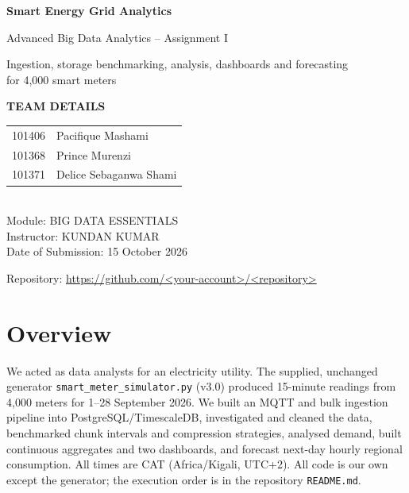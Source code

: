 \documentclass[11pt,a4paper]{article}
\newcommand{\submissiondate}{15 October 2026}
\newcommand{\repourl}{\url{https://github.com/<your-account>/<repository>}}
\begin{document}
\begin{titlepage}
\centering
\vspace*{2.5cm}
{\Huge\bfseries Smart Energy Grid Analytics\par}
\vspace{0.4cm}
{\Large Advanced Big Data Analytics -- Assignment I\par}
\vspace{0.3cm}
{\large Ingestion, storage benchmarking, analysis, dashboards and forecasting\\
for 4,000 smart meters\par}
\vspace{2.2cm}

\begin{tcolorbox}[colback=teambg, colframe=teamframe, boxrule=0.6pt, arc=0pt,
                  width=0.9\linewidth, halign=center, top=10pt, bottom=10pt]
{\large\bfseries\color{teamtitle} TEAM DETAILS}\\[8pt]
\begin{tabular}{ll}
101406 & Pacifique Mashami\\
101368 & Prince Murenzi\\
101371 & Delice Sebaganwa Shami\\
\end{tabular}\\[10pt]
Module: BIG DATA ESSENTIALS\\[6pt]
Instructor: KUNDAN KUMAR\\[6pt]
Date of Submission: \submissiondate
\end{tcolorbox}

\vfill
{\small Repository: \repourl}
\end{titlepage}

\tableofcontents
\newpage

\section*{Overview}
We acted as data analysts for an electricity utility. The supplied, unchanged
generator \texttt{smart\_meter\_simulator.py} (v3.0) produced 15-minute readings
from 4,000 meters for 1--28 September 2026. We built an MQTT and bulk ingestion
pipeline into PostgreSQL/TimescaleDB, investigated and cleaned the data,
benchmarked chunk intervals and compression strategies, analysed demand, built
continuous aggregates and two dashboards, and forecast next-day hourly regional
consumption. All times are CAT (Africa/Kigali, UTC+2). All code is our own except
the generator; the execution order is in the repository \texttt{README.md}.
\end{document}
